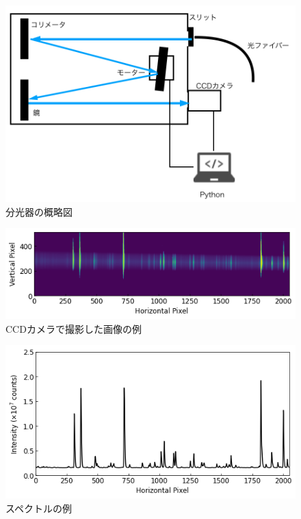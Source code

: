 \begin{figure}
    \centering
    \includegraphics[width=15cm]{pictures/spectrometer-picture.png}
    \caption{分光器の概略図}
    \label{fig:spectrometer-picture}
\end{figure}

\begin{figure}
    \centering
    \includegraphics[width=15cm]{pictures/picture-example.png}
    \caption{CCDカメラで撮影した画像の例}
    \label{fig:picture-example}
\end{figure}

\begin{figure}
    \centering
    \includegraphics[width=15cm]{pictures/spectrum-example.png}
    \caption{スペクトルの例}
    \label{fig:spectrum-example}
\end{figure}


